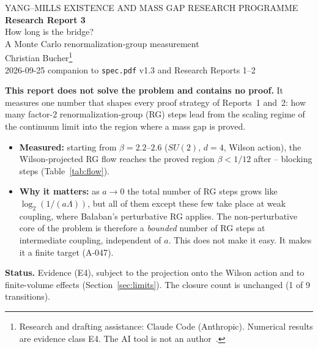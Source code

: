 \documentclass[11pt,a4paper]{article}
\newcommand{\idref}[1]{\textsf{#1}}
\begin{document}
\begin{center}
{\sffamily\small YANG--MILLS EXISTENCE AND MASS GAP \textperiodcentered{} RESEARCH PROGRAMME}\\[8pt]
{\LARGE\bfseries Research Report 3}\\[4pt]
{\Large How long is the bridge?\\A Monte Carlo renormalization-group measurement}\\[10pt]
{\large Christian Bucher}\footnote{Research and drafting assistance: Claude Code (Anthropic). Numerical results are evidence class E4. The AI tool is not an author~\cite{COPE23}.}\\[4pt]
{\small 2026-09-25 \textperiodcentered{} companion to \texttt{spec.pdf} v1.3 and Research Reports 1--2}
\end{center}

\begin{keybox}[title=Result in brief]
\textbf{This report does not solve the problem and contains no proof.} It measures one number that shapes every proof strategy of Reports~1 and~2: how many factor-2 renormalization-group (RG) steps lead from the scaling regime of the continuum limit into the region where a mass gap is proved.
\begin{itemize}[leftmargin=1.2em]
\item \textbf{Measured:} starting from $\beta=2.2$--$2.6$ ($SU(2)$, $d=4$, Wilson action), the Wilson-projected RG flow reaches the proved region $\beta<1/12$ after \BridgeStepsMin--\BridgeStepsMax{} blocking steps (Table~\ref{tab:flow}).
\item \textbf{Why it matters:} as $a\to0$ the total number of RG steps grows like $\log_2(1/(a\Lambda))$, but all of them except these few take place at weak coupling, where Ba{\l}aban's perturbative RG applies. The non-perturbative core of the problem is therefore a \emph{bounded} number of RG steps at intermediate coupling, independent of $a$. This does not make it easy. It makes it a finite target (\idref{A-047}).
\end{itemize}
\textbf{Status.} Evidence (E4), subject to the projection onto the Wilson action and to finite-volume effects (Section~\ref{sec:limits}). The closure count is unchanged (1 of 9 transitions).
\end{keybox}

\end{document}
